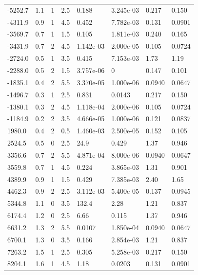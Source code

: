 \documentclass[preview]{standalone}
\begin{document}
{{\begin{tabular}{L{1.2cm}C{1.2cm} C{0.3cm}C{0.5cm} C{1.4cm}C{1.4cm} C{1.4cm}C{1.4cm}}
  -5252.7  &   1.1  & 1     & 2.5 &  0.188  & 3.245e-03  & 0.217 &  0.150   \\ 
  -4311.9  &   0.9  & 1     & 4.5 &  0.452  & 7.782e-03  & 0.131 &  0.0901   \\ 
  -3569.7  &   0.7  & 1     & 1.5 &  0.105  & 1.811e-03  & 0.240 &  0.165   \\ 
  -3431.9  &   0.7  & 2     & 4.5 &  1.142e-03  & 2.000e-05  & 0.105 &  0.0724   \\ 
  -2724.0  &   0.5  & 1     & 3.5 &  0.415  & 7.153e-03  & 1.73 &  1.19   \\ 
  -2288.0  &   0.5  & 2     & 1.5 &  3.757e-06  & 0  & 0.147 &  0.101   \\ 
  -1835.1  &   0.4  & 2     & 5.5 &  3.370e-05  & 1.000e-06  & 0.0940 &  0.0647   \\ 
  -1496.7  &   0.3  & 1     & 2.5 &  0.831  & 0.0143  & 0.217 &  0.150   \\ 
  -1380.1  &   0.3  & 2     & 4.5 &  1.118e-04  & 2.000e-06  & 0.105 &  0.0724   \\ 
  -1184.9  &   0.2  & 2     & 3.5 &  4.666e-05  & 1.000e-06  & 0.121 &  0.0837   \\ 
  1980.0  &   0.4  & 2     & 0.5 &  1.460e-03  & 2.500e-05  & 0.152 &  0.105   \\ 
  2524.5  &   0.5  & 0     & 2.5 &  24.9  & 0.429  & 1.37 &  0.946   \\ 
  3356.6  &   0.7  & 2     & 5.5 &  4.871e-04  & 8.000e-06  & 0.0940 &  0.0647   \\ 
  3559.8  &   0.7  & 1     & 4.5 &  0.224  & 3.865e-03  & 1.31 &  0.901   \\ 
  4389.9  &   0.9  & 1     & 1.5 &  0.429  & 7.385e-03  & 2.40 &  1.65   \\ 
  4462.3  &   0.9  & 2     & 2.5 &  3.112e-03  & 5.400e-05  & 0.137 &  0.0945   \\ 
  5344.8  &   1.1  & 0     & 3.5 &  132.4  & 2.28  & 1.21 &  0.837   \\ 
  6174.4  &   1.2  & 0     & 2.5 &  6.66  & 0.115  & 1.37 &  0.946   \\ 
  6631.2  &   1.3  & 2     & 5.5 &  0.0107  & 1.850e-04  & 0.0940 &  0.0647   \\ 
  6700.1  &   1.3  & 0     & 3.5 &  0.166  & 2.854e-03  & 1.21 &  0.837   \\ 
  7263.2  &   1.5  & 1     & 2.5 &  0.305  & 5.258e-03  & 0.217 &  0.150   \\ 
  8204.1  &   1.6  & 1     & 4.5 &  1.18  & 0.0203  & 0.131 &  0.0901   \\ 

\end{tabular}}}
\end{document}
